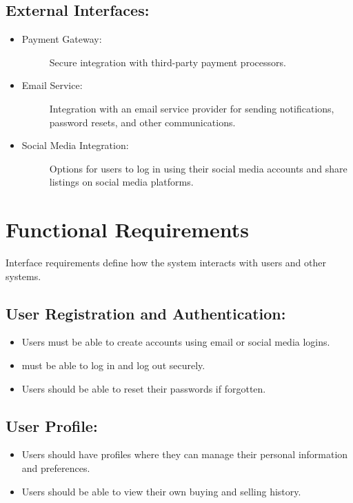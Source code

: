 \subsection{External Interfaces:}
\begin{itemize}
    \item \begin{description}
        \item[Payment Gateway:] Secure integration with third-party payment processors.
    \end{description}
    \item \begin{description}
        \item[Email Service: ] Integration with an email service provider for sending notifications, password resets, and other communications.
    \end{description}
    \item \begin{description}
        \item[Social Media Integration:] Options for users to log in using their social media accounts and share listings on social media platforms.
    \end{description}
\end{itemize} 

\section{Functional Requirements}
Interface requirements define how the system interacts with users and other systems.

\subsection{User Registration and Authentication:}
\begin{itemize}
        \item Users must be able to create accounts using email or social media logins.
    
        \item must be able to log in and log out securely.

        \item Users should be able to reset their passwords if forgotten.
\end{itemize}

\subsection{User Profile:}
\begin{itemize}
        \item Users should have profiles where they can manage their personal information and preferences.
    
        \item Users should be able to view their own buying and selling history.
\end{itemize}

